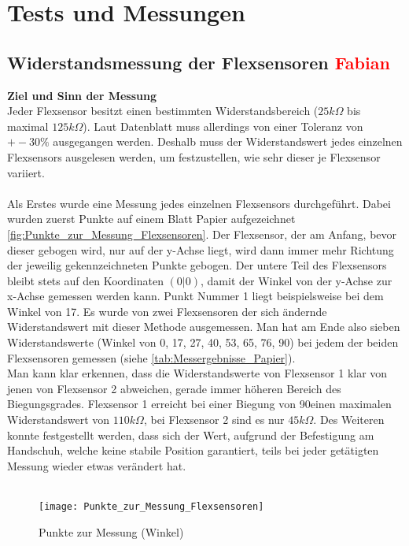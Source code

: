 \documentclass[titlepage,12pt,twoside]{article}
\begin{document}
\newpage
\section{Tests und Messungen}
\subsection{Widerstandsmessung der Flexsensoren \textcolor{red}{Fabian}}
\textbf{Ziel und Sinn der Messung} \\
Jeder Flexsensor besitzt einen bestimmten Widerstandsbereich ($25k\Omega$ bis maximal $125k\Omega$). Laut Datenblatt muss allerdings von einer Toleranz von $+-30\%$ ausgegangen 
werden. Deshalb muss der Widerstandswert jedes einzelnen Flexsensors ausgelesen werden, um festzustellen, wie sehr dieser je Flexsensor variiert. \\
\\
Als Erstes wurde eine Messung jedes einzelnen Flexsensors durchgeführt. Dabei wurden zuerst Punkte auf einem Blatt Papier aufgezeichnet \autoref{fig:Punkte_zur_Messung_Flexsensoren}. 
Der Flexsensor, der am Anfang, bevor dieser gebogen wird, nur auf der y-Achse liegt, wird dann immer mehr Richtung der jeweilig gekennzeichneten Punkte gebogen. 
Der untere Teil des Flexsensors bleibt stets auf den Koordinaten $(0|0)$, damit der Winkel von der y-Achse zur x-Achse gemessen werden kann. Punkt Nummer 1 liegt 
beispielsweise bei dem Winkel von 17\textdegree. Es wurde von zwei Flexsensoren der sich ändernde Widerstandswert mit dieser Methode ausgemessen. Man hat am Ende also sieben 
Widerstandswerte (Winkel von 0\textdegree, 17\textdegree, 27\textdegree, 40\textdegree, 53\textdegree, 65\textdegree, 76\textdegree, 90\textdegree) bei jedem der beiden Flexsensoren gemessen (siehe \autoref{tab:Messergebnisse_Papier}). \\
Man kann klar erkennen, dass die Widerstandswerte von Flexsensor 1 klar von jenen von Flexsensor 2 abweichen, gerade immer höheren Bereich des Biegungsgrades. 
Flexsensor 1 erreicht bei einer Biegung von 90\textdegree einen maximalen Widerstandswert von $110k\Omega$, bei Flexsensor 2 sind es nur $45k\Omega$. Des Weiteren konnte festgestellt 
werden, dass sich der Wert, aufgrund der Befestigung am Handschuh, welche keine stabile Position garantiert, teils bei jeder getätigten Messung wieder etwas verändert hat. \\
\\
\begin{figure}[H]
	\begin{center}
		\scalebox{1.0}
		{\texttt{[image: Punkte\_zur\_Messung\_Flexsensoren]}}
		\caption{Punkte zur Messung (Winkel)}
		\label{fig:Punkte_zur_Messung_Flexsensoren}				
	\end{center}
\end{figure}
\hfill \break
\end{document}
